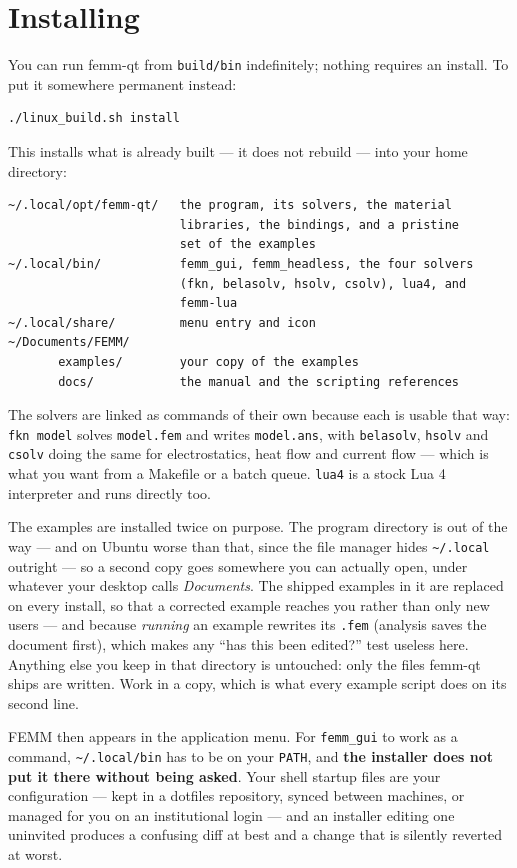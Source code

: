 \documentclass[11pt]{article}
\begin{document}
\section{Installing}

You can run femm-qt from \texttt{build/bin} indefinitely; nothing requires
an install.  To put it somewhere permanent instead:
\begin{lstlisting}
./linux_build.sh install
\end{lstlisting}

This installs what is already built --- it does not rebuild --- into your
home directory:
\begin{lstlisting}
~/.local/opt/femm-qt/   the program, its solvers, the material
                        libraries, the bindings, and a pristine
                        set of the examples
~/.local/bin/           femm_gui, femm_headless, the four solvers
                        (fkn, belasolv, hsolv, csolv), lua4, and
                        femm-lua
~/.local/share/         menu entry and icon
~/Documents/FEMM/
       examples/        your copy of the examples
       docs/            the manual and the scripting references
\end{lstlisting}

The solvers are linked as commands of their own because each is usable
that way: \texttt{fkn model} solves \texttt{model.fem} and writes
\texttt{model.ans}, with \texttt{belasolv}, \texttt{hsolv} and
\texttt{csolv} doing the same for electrostatics, heat flow and current
flow --- which is what you want from a Makefile or a batch queue.
\texttt{lua4} is a stock Lua 4 interpreter and runs directly too.

The examples are installed twice on purpose.  The program directory is out
of the way --- and on Ubuntu worse than that, since the file manager hides
\texttt{\textasciitilde/.local} outright --- so a second copy goes somewhere
you can actually open, under whatever your desktop calls \emph{Documents}.
The shipped examples in it are replaced on every install, so that a
corrected example reaches you rather than only new users --- and because
\emph{running} an example rewrites its \texttt{.fem} (analysis saves the
document first), which makes any ``has this been edited?'' test useless
here.  Anything else you keep in that directory is untouched: only the
files femm-qt ships are written.  Work in a copy, which is what every
example script does on its second line.

FEMM then appears in the application menu.  For \texttt{femm\_gui} to work
as a command, \texttt{\textasciitilde/.local/bin} has to be on your
\texttt{PATH}, and \textbf{the installer does not put it there without being
asked}.  Your shell startup files are your configuration --- kept in a
dotfiles repository, synced between machines, or managed for you on an
institutional login --- and an installer editing one uninvited produces a
confusing diff at best and a change that is silently reverted at worst.
\end{document}
